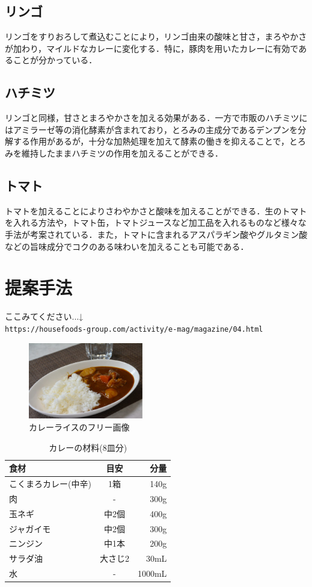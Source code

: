 \documentclass[a4paper, 11pt]{jsarticle}
\begin{document}
\subsection{リンゴ}
リンゴをすりおろして煮込むことにより，リンゴ由来の酸味と甘さ，まろやかさが加わり，マイルドなカレーに変化する．特に，豚肉を用いたカレーに有効であることが分かっている．

\subsection{ハチミツ}
リンゴと同様，甘さとまろやかさを加える効果がある．一方で市販のハチミツにはアミラーゼ等の消化酵素が含まれており，とろみの主成分であるデンプンを分解する作用があるが，十分な加熱処理を加えて酵素の働きを抑えることで，とろみを維持したままハチミツの作用を加えることができる．

\subsection{トマト}
トマトを加えることによりさわやかさと酸味を加えることができる．生のトマトを入れる方法や，トマト缶，トマトジュースなど加工品を入れるものなど様々な手法が考案されている．また，トマトに含まれるアスパラギン酸やグルタミン酸などの旨味成分でコクのある味わいを加えることも可能である．

\section{提案手法}
ここみてください...↓\\
\texttt{https://housefoods-group.com/activity/e-mag/magazine/04.html}

\begin{figure}[htb]
\begin{center}
\includegraphics[clip,width = 5.0cm]{curry.eps}
\end{center}
\caption{カレーライスのフリー画像}  \label{curryfig}
\end{figure}

\begin{table}[htb]
 \caption{カレーの材料(8皿分)}
 \centering
 \begin{tabular}{lcr}
 \hline
食材 & 目安 & 分量 \\
\hline\hline
こくまろカレー(中辛) & 1箱 & 140g\\
肉 & - & 300g\\
玉ネギ & 中2個 & 400g \\
ジャガイモ & 中2個 & 300g \\
ニンジン & 中1本 & 200g \\
サラダ油 & 大さじ2 & 30mL \\
水 & - & 1000mL \\
\hline
\end{tabular}
\end{table}
\end{document}
